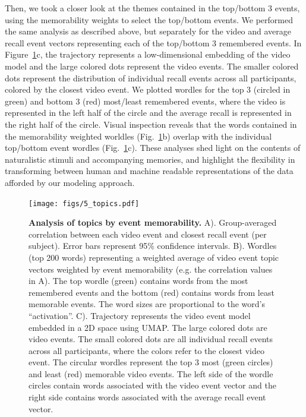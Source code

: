 \documentclass{article}
\begin{document}
{Then, we took a closer look at the themes contained in the top/bottom 3 events, using the memorability weights to select the top/bottom events. We performed the same analysis as described above, but separately for the video and average recall event vectors representing each of the top/bottom 3 remembered events. In Figure~\ref{fig:topics}c, the trajectory represents a low-dimensional embedding of the video model and the large colored dots represent the video events. The smaller colored dots represent the distribution of individual recall events across all participants, colored by the closest video event. We plotted wordles for the top 3 (circled in green) and bottom 3 (red) most/least remembered events, where the video is represented in the left half of the circle and the average recall is represented in the right half of the circle. Visual inspection reveals that the words contained in the memorability weighted worldles (Fig.~\ref{fig:topics}b) overlap with the individual top/bottom event wordles (Fig.~\ref{fig:topics}c). These analyses shed light on the contents of naturalistic stimuli and accompanying memories, and highlight the flexibility in transforming between human and machine readable representations of the data afforded by our modeling approach.

\begin{figure}[t!]
\centering
\texttt{[image: figs/5\_topics.pdf]}
\caption{\small \textbf{Analysis of topics by event memorability.} A). Group-averaged correlation between each video event and closest recall event (per subject). Error bars represent 95\% confidence intervals. B). Wordles (top 200 words) representing a weighted average of video event topic vectors weighted by event memorability (e.g. the correlation values in A). The top wordle (green) contains words from the most remembered events and the bottom (red) contains words from least memorable events. The word sizes are proportional to the word's ``activation''. C). Trajectory represents the video event model embedded in a 2D space using UMAP. The large colored dots are video events. The small colored dots are all individual recall events across all participants, where the colors refer to the closest video event. The circular wordles represent the top 3 most (green circles) and least (red) memorable video events.  The left side of the wordle circles contain words associated with the video event vector and the right side contains words associated with the average recall event vector.}
\label{fig:topics}
\end{figure}

}
\end{document}
